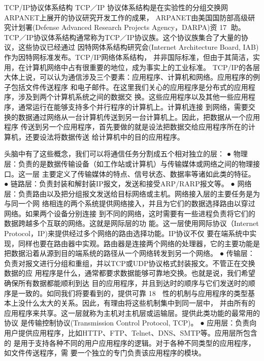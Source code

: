 TCP/IP协议体系结构
TCP／IP 协议体系结构是在实验性的分组交换网ARPANET上展开的协议研究开发工作的成果，
ARPANET由美国国防部高级研究计划署(Defense Advanced Research Projects Agency，DARPA)资
                                                                     17
助。TCP／IP协议体系结构通常称为TCP／IP协议族。这个协议族集合了大量的协议，这些协议已经通过
因特网体系结构研究会(Internet Architecture Board, IAB)作为因特网标准发布。TCP/IP网络体系结构，
并非国际标准，但由于其简洁，实用，在计算机网络中占有很重要的地位，成为事实上的工业标准。
TCP/IP的各层
大体上说，可以认为通信涉及三个要素：应用程序、计算机和网络。应用程序的例子包括文件传送程序
和电子邮件。在这里我们关心的应用程序是分布式的应用程序，涉及到两个计算机系统之间的数据交
换。这些应用程序以及其他一些应用程序，通常运行在能够支持多个并行程序的计算机上。计算机连接
到网络，需要交换的数据通过网络从一台计算机传送到另一台计算机上。因此，把数据从一个应用程序
传送到另一个应用程序，首先要做的就是设法把数据交给应用程序所在的计算机，还要设法将数据传送
给计算机中的目的应用程序。




头脑中有了这些概念，我们可以将通信任务分割成五个相对独立的层：
 ● 物理层：负责的是数据传输设备（如工作站或计算机）与传输媒体或网络之间的物理接口。这一层
   主要定义了传输媒体的特点、信号状态、数据率等诸如此类的特征。
 ● 链路层：负责封装和解封装IP报文，发送和接受ARP/RARP报文等。
 ● 网络层：负责路由以及把分组报文发送给目标网络或主机。网络接入层的主要任务是为与同一个网
   络相连的两个系统提供网络接入，并且为它们的数据选择路由以穿过网络。如果两个设备分别连接
   到不同的网络，这时需要有一些进程负责将它们的数据跨越多个互联的网络。这就是网际层的功
   能。这一层使用网际协议（Internet Protocol，IP)来提供经过多个网络的路由选择功能。IP协议不仅
   要在端系统中实现，同样也要在路由器中实观。路由器是连接两个网络的处理器，它的主要功能是
   把数据沿着从源到目的端系统的路径从一个网络转发到另一个网络。
 ● 传输层：负责对报文进行分组和重组，并以TCP或UDP协议格式封装报文。不管正在交换数据的应
   用程序是什么，通常都要求数据能够可靠地交换。也就是说，我们希望确保所有数据都能顺利到达
   目的应用程序，并且到达时的顺序与它们发送时的顺序是一致的。如同我们将要看到的，提供可靠
                                                                 18
    性的机制与应用程序的类型基本上没什么太大的关系。因此，有理由将这些机制集中到同一层中，
    并由所有的应用程序来共享。这一层就称为主机对主机层或运输层。提供此类功能的最常用的协议
    是传输控制协议(Transmission Control Protocol, TCP)。
  ● 应用层：负责向用户提供应用程序，比如HTTP、FTP、Telnet、DNS、SMTP等。应用层所包含的
    是用于支持各种不同的用户应用程序的逻辑。对于各种不同类型的应用程序，如文件传送程序，需
    要一个独立的专门负责该应用程序的模块。

